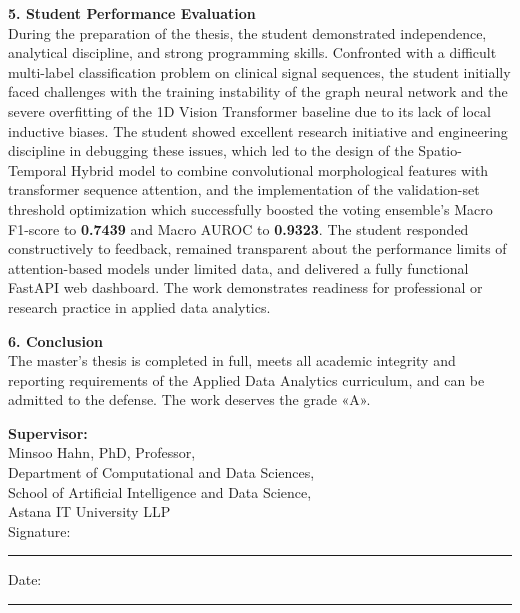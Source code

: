 \documentclass[12pt,a4paper]{article}
\begin{document}
\noindent
\textbf{5. Student Performance Evaluation} \\
During the preparation of the thesis, the student demonstrated independence, analytical discipline, and strong programming skills. Confronted with a difficult multi-label classification problem on clinical signal sequences, the student initially faced challenges with the training instability of the graph neural network and the severe overfitting of the 1D Vision Transformer baseline due to its lack of local inductive biases. The student showed excellent research initiative and engineering discipline in debugging these issues, which led to the design of the Spatio-Temporal Hybrid model to combine convolutional morphological features with transformer sequence attention, and the implementation of the validation-set threshold optimization which successfully boosted the voting ensemble's Macro F1-score to \textbf{0.7439} and Macro AUROC to \textbf{0.9323}. The student responded constructively to feedback, remained transparent about the performance limits of attention-based models under limited data, and delivered a fully functional FastAPI web dashboard. The work demonstrates readiness for professional or research practice in applied data analytics.
\vspace{1em}

\noindent
\textbf{6. Conclusion} \\
The master's thesis is completed in full, meets all academic integrity and reporting requirements of the Applied Data Analytics curriculum, and can be admitted to the defense. The work deserves the grade «A».

\vspace{3em}
\noindent
\textbf{Supervisor:} \\
Minsoo Hahn, PhD, Professor, \\
Department of Computational and Data Sciences, \\
School of Artificial Intelligence and Data Science, \\
Astana IT University LLP \\

\vspace{2.5em}
\noindent
Signature: \rule{4cm}{0.5pt} \hfill Date: \rule{4cm}{0.5pt}
\end{document}

